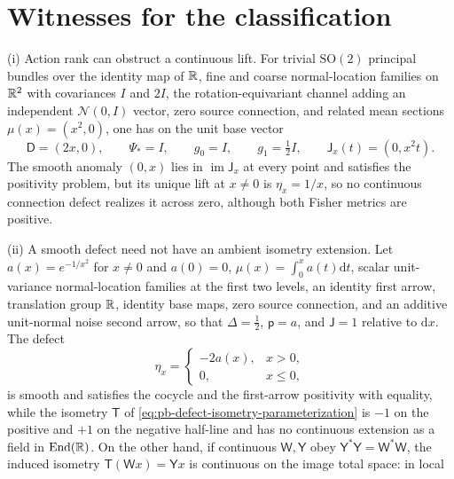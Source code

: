 \section{Witnesses for the classification}
\label{sec:app-base-witnesses}

(i) Action rank can obstruct a continuous lift. For trivial \(\mathrm{SO}(2)\) principal bundles over the
identity map of \(\mathbb R\), fine and coarse normal-location families on \(\mathbb R^2\) with covariances \(I\) and
\(2I\), the rotation-equivariant channel adding an independent \(\mathcal N(0,I)\) vector, zero source
connection, and related mean sections \(\mu(x)=(x^2,0)\), one has on the unit base vector
\begin{equation}
\mathsf D=(2x,0),\qquad \Psi_*=I,\qquad
g_0=I,\qquad g_1=\tfrac12 I,\qquad
\mathsf J_x(t)=(0,x^2t).
\label{eq:pb-defect-action-rank-example}
\end{equation}
The smooth anomaly \((0,x)\) lies in \(\operatorname{im}\mathsf J_x\) at every point and satisfies the
positivity problem, but its unique lift at \(x\ne0\) is \(\eta_x=1/x\), so no continuous connection
defect realizes it across zero, although both Fisher metrics are positive.
\par
(ii) A smooth defect need not have an ambient isometry extension. Let \(a(x)=e^{-1/x^2}\) for
\(x\ne0\) and \(a(0)=0\), \(\mu(x)=\int_0^xa(t)\mathrm dt\), scalar unit-variance normal-location
families at the first two levels, an identity first arrow, translation group \(\mathbb R\), identity base maps,
zero source connection, and an additive unit-normal noise second arrow, so that \(\Delta=\tfrac12\),
\(\mathsf p=a\), and \(\mathsf J=1\) relative to \(\mathrm dx\). The defect
\begin{equation}
\eta_x=
\begin{cases}
-2a(x),&x>0,\\
0,&x\leq0,
\end{cases}
\label{eq:pb-defect-flat-jet-example}
\end{equation}
is smooth and satisfies the cocycle and the first-arrow positivity with equality, while the isometry
\(\mathsf T\) of \eqref{eq:pb-defect-isometry-parameterization} is \(-1\) on the positive and \(+1\) on the
negative half-line and has no continuous extension as a field in \(\operatorname{End}(\mathbb R)\). On the
other hand, if continuous \(\mathsf W,\mathsf Y\) obey \(\mathsf Y^*\mathsf Y=\mathsf W^*\mathsf W\), the
induced isometry \(\mathsf T(\mathsf Wx)=\mathsf Yx\) is continuous on the image total space: in local
